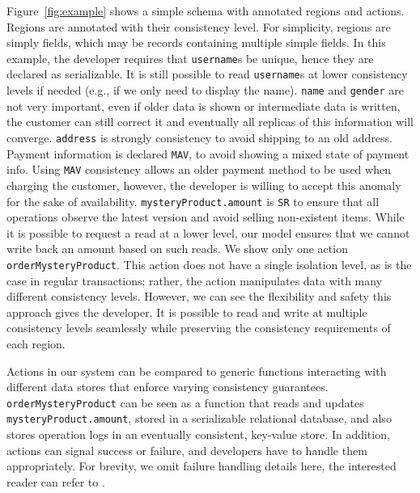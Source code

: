 \documentclass[preprint,numbers]{sigplanconf}
\begin{document}
Figure~\ref{fig:example} shows a simple schema with annotated
regions and actions. Regions are annotated 
with their consistency level. For simplicity, regions are simply fields,
which may be records containing multiple simple fields.
%
In this example, the developer requires that \texttt{username}s be 
unique, hence they are declared as serializable.
It is still possible to read \texttt{username}s at lower
consistency levels if needed (e.g., if we only need to display the name). 
\texttt{name} and \texttt{gender} are not very important, even if older
data is shown or intermediate data is written, the customer can still correct
it and eventually all replicas of this information will converge.
\texttt{address} is strongly consistency to avoid shipping to an old address.
Payment information is declared \texttt{MAV}, to avoid showing a mixed state
of payment info. Using \texttt{MAV} consistency
allows an older payment method to be used when charging the customer,
however, the developer is willing to accept this anomaly for the sake of
availability. \texttt{mysteryProduct.amount} is \texttt{SR} to ensure that all operations
observe the latest version and avoid selling non-existent items. While it is possible to request a read at a lower
level, our model ensures that we cannot write back an amount based on such reads.
%
We show only one action \texttt{orderMysteryProduct}. This action does
not have a single isolation level, as is the case in regular transactions;
rather, the action manipulates data with many different consistency levels.
However, we can see the flexibility and safety this approach gives the
developer. It is possible to read and write at multiple consistency levels
seamlessly while preserving the consistency requirements of each region.

Actions in our system can be compared to generic functions interacting
with different data stores that enforce varying consistency guarantees.
\texttt{orderMysteryProduct} can be seen as a function that
reads and updates \texttt{mysteryProduct.amount}, stored in a
serializable relational database, and also stores operation logs in an eventually consistent,
key-value store. In addition, actions can signal success
or failure, and developers have to handle them appropriately. For brevity, we
omit failure handling details here, the interested reader can refer to
\cite{??}.~
\end{document}
